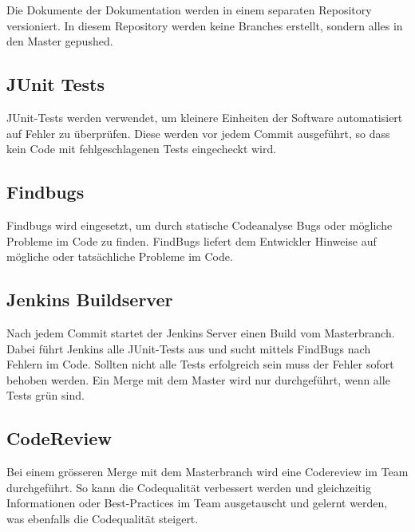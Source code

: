 \documentclass[11pt]{scrartcl}
\begin{document}
Die Dokumente der Dokumentation werden in einem separaten Repository versioniert. In diesem Repository werden keine Branches erstellt, sondern alles in den Master gepushed.
\subsection{JUnit Tests}
JUnit-Tests werden verwendet, um kleinere Einheiten der Software automatisiert auf Fehler zu überprüfen. Diese werden vor jedem Commit ausgeführt, so dass kein Code mit fehlgeschlagenen Tests eingecheckt wird.
\subsection{Findbugs}
Findbugs wird eingesetzt, um durch statische Codeanalyse Bugs oder mögliche Probleme im Code zu finden. FindBugs liefert dem Entwickler Hinweise auf mögliche oder tatsächliche Probleme im Code.
\subsection{Jenkins Buildserver}
Nach jedem Commit startet der Jenkins Server einen Build vom Masterbranch. Dabei führt Jenkins alle JUnit-Tests aus und sucht mittels FindBugs nach Fehlern im Code. Sollten nicht alle Tests erfolgreich sein muss der Fehler sofort behoben werden. Ein Merge mit dem Master wird nur durchgeführt, wenn alle Tests grün sind.
\subsection{CodeReview}
Bei einem grösseren Merge mit dem Masterbranch wird eine Codereview im Team durchgeführt. So kann die Codequalität verbessert werden und gleichzeitig Informationen oder Best-Practices im Team ausgetauscht und gelernt werden, was ebenfalls die Codequalität steigert.
\end{document}
